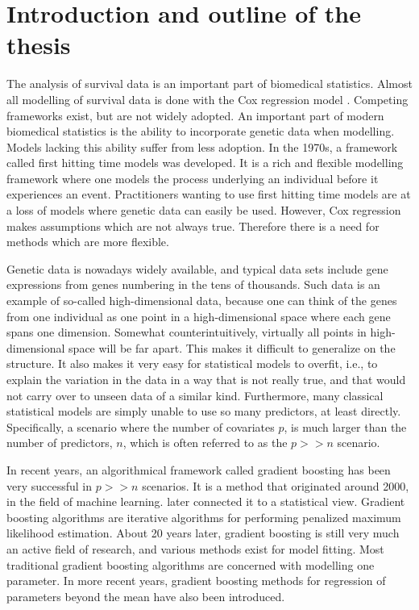 \chapter{Introduction and outline of the thesis}
\label{sec:intro}
The analysis of survival data is an important part of biomedical statistics.
Almost all modelling of survival data is done with the Cox regression model \citep{cox-model}.
Competing frameworks exist, but are not widely adopted.
An important part of modern biomedical statistics is the ability to incorporate genetic data when modelling.
Models lacking this ability suffer from less adoption.
In the 1970s, a framework called first hitting time models was developed.
It is a rich and flexible modelling framework where one models the process underlying an individual before it experiences an event.
Practitioners wanting to use first hitting time models are at a loss of models where genetic data can easily be used.
However, Cox regression makes assumptions which are not always true.
Therefore there is a need for methods which are more flexible.

Genetic data is nowadays widely available, and typical data sets include gene expressions from genes numbering in the tens of thousands.
Such data is an example of so-called high-dimensional data, because one can think of the genes from one individual as one point in a high-dimensional space where each gene spans one dimension.
Somewhat counterintuitively, virtually all points in high-dimensional space will be far apart.
This makes it difficult to generalize on the structure.
It also makes it very easy for statistical models to overfit, i.e., to explain the variation in the data in a way that is not really true, and that would not carry over to unseen data of a similar kind.
Furthermore, many classical statistical models are simply unable to use so many predictors, at least directly.
Specifically, a scenario where the number of covariates $p$, is much larger than the number of predictors, $n$, which is often referred to as the $p>>n$ scenario.

In recent years, an algorithmical framework called gradient boosting has been very successful in $p>>n$ scenarios.
It is a method that originated around 2000, in the field of machine learning.
\citet{friedman2001} later connected it to a statistical view.
Gradient boosting algorithms are iterative algorithms for performing penalized maximum likelihood estimation.
About 20 years later, gradient boosting is still very much an active field of research, and various methods exist for model fitting.
Most traditional gradient boosting algorithms are concerned with modelling one parameter.
In more recent years, gradient boosting methods for regression of parameters beyond the mean have also been introduced.

